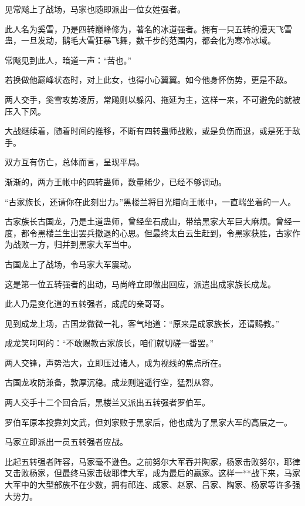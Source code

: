 
\begin{this_body}

见常飚上了战场，马家也随即派出一位女姓强者。

此人名为奚雪，乃是四转巅峰修为，著名的冰道强者。拥有一只五转的漫天飞雪蛊，一旦发动，鹅毛大雪狂暴飞舞，数千步的范围内，都会化为寒冷冰域。

常飚见到此人，暗道一声：“苦也。”

若换做他巅峰状态时，对上此女，也得小心翼翼。如今他身怀伤势，更是不敌。

两人交手，奚雪攻势凌厉，常飚则以躲闪、拖延为主，这样一来，不可避免的就被压入下风。

大战继续着，随着时间的推移，不断有四转蛊师战败，或是负伤而退，或是死于敌手。

双方互有伤亡，总体而言，呈现平局。

渐渐的，两方王帐中的四转蛊师，数量稀少，已经不够调动。

“古家族长，还请你在此刻出力。”黑楼兰将目光瞄向王帐中，一直端坐着的一人。

古家族长古国龙，乃是土道蛊师，曾经垒石成山，带给黑家大军巨大麻烦。曾经一度，都令黑楼兰生出罢兵撤退的心思。但最终太白云生赶到，令黑家获胜，古家作为战败一方，归并到黑家大军当中。

古国龙上了战场，令马家大军震动。

这是第一位五转强者的出动，马尚峰立即做出回应，派遣出成家族长成龙。

此人乃是变化道的五转强者，成虎的亲哥哥。

见到成龙上场，古国龙微微一礼，客气地道：“原来是成家族长，还请赐教。”

成龙笑呵呵的：“不敢赐教古家族长，咱们就切磋一番罢。”

两人交锋，声势浩大，立即压过诸人，成为视线的焦点所在。

古国龙攻防兼备，敦厚沉稳。成龙则逍遥行空，猛烈从容。

两人交手十二个回合后，黑楼兰又派出五转强者罗伯军。

罗伯军原本投靠刘文武，但刘家败于黑家后，他也成为了黑家大军的高层之一。

马家立即派出一员五转强者应战。

比起五转强者阵容，马家毫不逊色。之前努尔大军吞并陶家，杨家击败努尔，耶律又击败杨家，但最终马家击破耶律大军，成为最后的赢家。这样一**战下来，马家大军中的大型部族不在少数，拥有祁连、成家、赵家、吕家、陶家、杨家等许多强大势力。


\end{this_body}
